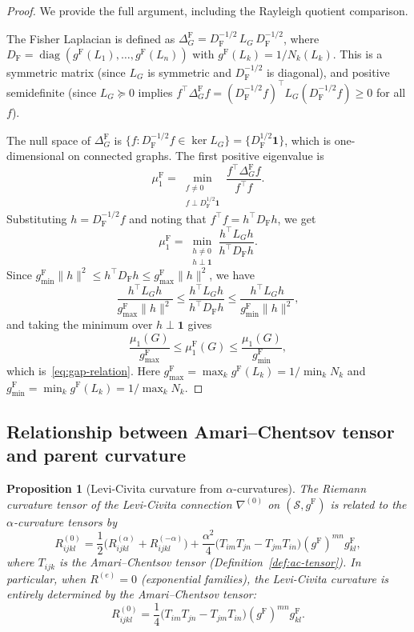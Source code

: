\documentclass[11pt]{article}
\DeclareMathOperator{\diag}{diag}
\newcommand{\gF}{g^{\mathrm{F}}}
\newtheorem{proposition}{Proposition}
\theoremstyle{remark}
\begin{document}
\begin{proof}
We provide the full argument, including the Rayleigh quotient comparison.

The Fisher Laplacian is defined as
$\Delta^{\mathrm{F}}_G = D_{\mathrm{F}}^{-1/2}\, L_G\, D_{\mathrm{F}}^{-1/2}$,
where $D_{\mathrm{F}} = \diag(\gF(L_1), \dots, \gF(L_n))$ with
$\gF(L_k) = 1/N_k(L_k)$.  This is a symmetric matrix (since $L_G$ is
symmetric and $D_{\mathrm{F}}^{-1/2}$ is diagonal), and positive semidefinite
(since $L_G \succeq 0$ implies
$f^\top \Delta^{\mathrm{F}}_G f = (D_{\mathrm{F}}^{-1/2} f)^\top L_G
(D_{\mathrm{F}}^{-1/2} f) \ge 0$ for all $f$).

The null space of $\Delta^{\mathrm{F}}_G$ is
$\{f : D_{\mathrm{F}}^{-1/2} f \in \ker L_G\}
= \{D_{\mathrm{F}}^{1/2} \mathbf{1}\}$,
which is one-dimensional on connected graphs.  The first positive eigenvalue is
\[
\mu_1^{\mathrm{F}} = \min_{\substack{f \neq 0 \\ f \perp D_{\mathrm{F}}^{1/2}
\mathbf{1}}} \frac{f^\top \Delta^{\mathrm{F}}_G f}{f^\top f}.
\]
Substituting $h = D_{\mathrm{F}}^{-1/2} f$ and noting that
$f^\top f = h^\top D_{\mathrm{F}} h$, we get
\[
\mu_1^{\mathrm{F}} = \min_{\substack{h \neq 0 \\ h \perp \mathbf{1}}}
\frac{h^\top L_G h}{h^\top D_{\mathrm{F}} h}.
\]
Since $\gF_{\min} \|h\|^2 \le h^\top D_{\mathrm{F}} h \le \gF_{\max}
\|h\|^2$, we have
\[
\frac{h^\top L_G h}{\gF_{\max} \|h\|^2}
\le \frac{h^\top L_G h}{h^\top D_{\mathrm{F}} h}
\le \frac{h^\top L_G h}{\gF_{\min} \|h\|^2},
\]
and taking the minimum over $h \perp \mathbf{1}$ gives
\[
\frac{\mu_1(G)}{\gF_{\max}}
\le \mu_1^{\mathrm{F}}(G)
\le \frac{\mu_1(G)}{\gF_{\min}},
\]
which is~\eqref{eq:gap-relation}.  Here $\gF_{\max} = \max_k \gF(L_k)
= 1/\min_k N_k$ and $\gF_{\min} = \min_k \gF(L_k) = 1/\max_k N_k$.
\end{proof}

\subsection{Relationship between Amari--Chentsov tensor and parent curvature}
\label{subsec:ac-parent}

\begin{proposition}[Levi-Civita curvature from $\alpha$-curvatures]
\label{prop:lc-from-alpha}
The Riemann curvature tensor of the Levi-Civita connection $\nabla^{(0)}$ on
$(\mathcal{S}, \gF)$ is related to the $\alpha$-curvature tensors by
\begin{equation}\label{eq:lc-alpha-curvature}
R^{(0)}_{ijkl} = \frac{1}{2}\bigl(R^{(\alpha)}_{ijkl}
+ R^{(-\alpha)}_{ijkl}\bigr)
+ \frac{\alpha^2}{4}\bigl(T_{im} T_{jn} - T_{jm} T_{in}\bigr)
(\gF)^{mn} \gF_{kl},
\end{equation}
where $T_{ijk}$ is the Amari--Chentsov tensor
(Definition~\ref{def:ac-tensor}).  In particular, when $R^{(e)} = 0$
(exponential families), the Levi-Civita curvature is entirely determined by
the Amari--Chentsov tensor:
\[
R^{(0)}_{ijkl} = \frac{1}{4}\bigl(T_{im} T_{jn} - T_{jm} T_{in}\bigr)
(\gF)^{mn} \gF_{kl}.
\]
\end{proposition}
\end{document}

